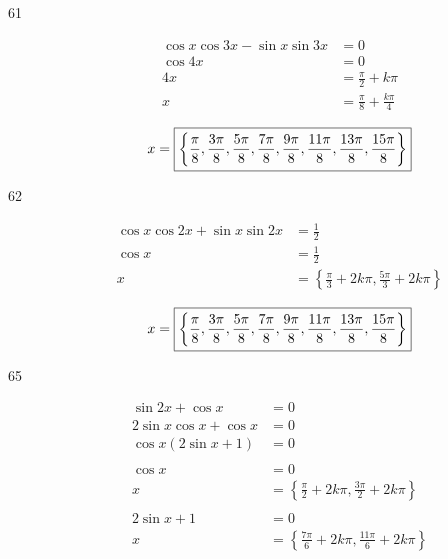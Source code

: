 \documentclass{exam}
\begin{document}
\begin{description}
      \item[61] 
        \begin{align*}
          \cos x \cos 3x - \sin x \sin 3x & = 0 \\
          \cos 4x                         & = 0 \\
          4x                              & = \frac{\pi}{2} + k \pi \\
          x                               & = \frac{\pi}{8} + \frac{k \pi}{4} \\
        \end{align*}
        \[
          x = \boxed{ \left\{ \frac{\pi}{8}, \frac{3 \pi}{8}, \frac{5 \pi}{8}, \frac{7 \pi}{8}, 
                                \frac{9 \pi}{8}, \frac{11 \pi}{8}, \frac{13 \pi}{8}, \frac{15 \pi}{8} \right\} } \\
        \]

      \item[62] 
        \begin{align*}
          \cos x \cos 2x + \sin x \sin 2x & = \frac{1}{2} \\
          \cos x                          & = \frac{1}{2} \\
          x                               & = \left\{ \frac{\pi}{3} + 2k \pi, \frac{5 \pi}{3} + 2k \pi \right\} \\
        \end{align*}
        \[
          x = \boxed{ \left\{ \frac{\pi}{8}, \frac{3 \pi}{8}, \frac{5 \pi}{8}, \frac{7 \pi}{8}, 
                              \frac{9 \pi}{8}, \frac{11 \pi}{8}, \frac{13 \pi}{8}, \frac{15 \pi}{8} \right\} } \\
        \]

      \item[65] 
        \begin{align*}
          \sin 2x + \cos x & = 0 \\
          2 \sin x \cos x + \cos x & = 0 \\
          \cos x (2 \sin x + 1) & = 0 \\
          \\
          \cos x & = 0 \\
          x      & = \left\{ \frac{\pi}{2} + 2k \pi, \frac{3 \pi}{2} + 2k \pi \right\} \\
          \\
          2 \sin x + 1 & = 0 \\
          x            & = \left\{ \frac{7 \pi}{6} + 2k \pi, \frac{11 \pi}{6} + 2k \pi \right\} \\
        \end{align*}


\end{description}
\end{document}
